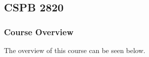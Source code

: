 \clearpage

\renewcommand{\ChapTitle}{\CSPBLA}
\renewcommand{\SectionTitle}{CSPB 2820}

\chapter{\ChapTitle}
\section{\SectionTitle}

\subsection{Course Overview}

The overview of this course can be seen below.

